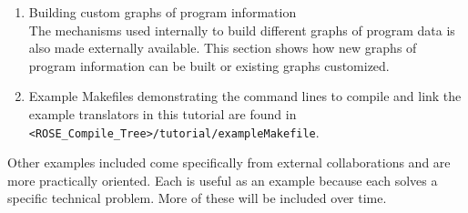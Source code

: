 \begin{enumerate}
     \item Building custom graphs of program information \\
           The mechanisms used internally to build different graphs of program data
           is also made externally available. This section shows how new graphs of 
           program information can be built or existing graphs customized.

     \item Example Makefiles demonstrating the command lines to compile and link the 
           example translators in this tutorial are found in 
           {\tt <ROSE\_Compile\_Tree>/tutorial/exampleMakefile}.

\end{enumerate}

   Other examples included come specifically from external collaborations
and are more practically oriented.  Each is useful as an example because each 
solves a specific technical problem.  More of these will be included over time.
